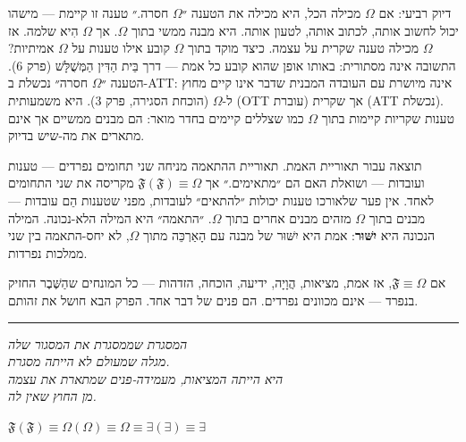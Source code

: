 \documentclass[10pt, openany, oneside]{book}
\begin{document}
דיוק רביעי: אם $\Omega$ מכילה הכל, היא מכילה את הטענה ״$\Omega$ חסרה.״ טענה זו קיימת — מישהו יכול לחשוב אותה, לכתוב אותה, לטעון אותה. היא מבנה ממשי בתוך $\Omega$. אך $\Omega$ הִיא שלמה. אז $\Omega$ מכילה טענה שקרית על עצמה. כיצד מוקד בתוך $\Omega$ קובע אילו טענות על $\Omega$ אמיתיות? התשובה אינה מסתורית: באותו אופן שהוא קובע כל אמת — דרך בֵּית הַדִּין הַמְּשֻׁלָּשׁ (פרק 6). הטענה ״$\Omega$ חסרה״ נכשלת ב-ATT: אינה מיושרת עם העובדה המבנית שדבר אינו קיים מחוץ ל-$\Omega$ (הוכחת הסגירה, פרק 3). היא משמעותית (OTT עוברת) אך שקרית (ATT נכשלת). טענות שקריות קיימות בתוך $\Omega$ כמו שצללים קיימים בחדר מואר: הם מבנים ממשיים אך אינם מתארים את מה-שיש בדיוק.

תוצאה עבור תאוריית האמת. תאוריית ההתאמה מניחה שני תחומים נפרדים — טענות ועובדות — ושואלת האם הם ״מתאימים.״ אך $\mathfrak{F}(\mathfrak{F}) \equiv \Omega$ מקריסה את שני התחומים לאחד. אין פער שלאורכו טענות יכולות ״להתאים״ לעובדות, מפני שטענות הֵם עובדות — מבנים בתוך $\Omega$ מזהים מבנים אחרים בתוך $\Omega$. ״התאמה״ היא המילה הלא-נכונה. המילה הנכונה היא \textbf{יִשּׁוּר}: אמת היא יִשּׁוּר של מבנה עם הָאַרְכֵּה מתוך $\Omega$, לא יחס-התאמה בין שני ממלכות נפרדות.

אם $\mathfrak{F} \equiv \Omega$, אז אמת, מציאות, הֲוָיָה, ידיעה, הוכחה, הזדהות — כל המונחים שהַשֶּׁבֶר החזיק בנפרד — אינם מכוונים נפרדים. הם פנים של דבר אחד. הפרק הבא חושל את זהותם.

\vspace{2em}

\begin{center}
    \rule{0.15\textwidth}{0.3pt}
\end{center}

\vspace{0.5em}

\begin{center}
    \textit{%
    המסגרת שממסגרת את המסגור שלה\\
    מגלה שמעולם לא הייתה מסגרת.}\\[0.8em]
    \textit{היא הייתה המציאות, מעמידה-פנים שמתארת את עצמה\\
    מן החוץ שאין לה.}
\end{center}

\vspace{0.5em}

\begin{center}
    $\mathfrak{F}(\mathfrak{F}) \equiv \Omega(\Omega) \equiv \Omega \equiv \exists(\exists) \equiv \exists$
\end{center}

%
%
%
\end{document}
